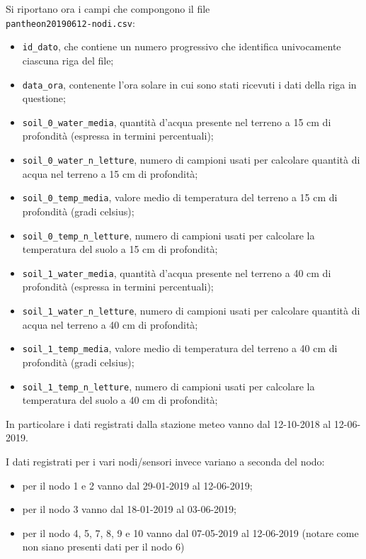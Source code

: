 Si riportano ora i campi che compongono il file \\ \texttt{pantheon20190612-nodi.csv}:

\begin{itemize}
  \item \texttt{id\_dato}, che contiene un numero progressivo che identifica univocamente ciascuna riga del file;
  \item \texttt{data\_ora}, contenente l'ora solare in cui sono stati ricevuti i dati della riga in questione;
  \item \texttt{soil\_0\_water\_media}, quantità d'acqua presente nel terreno a 15 cm di profondità (espressa in termini percentuali);
  \item \texttt{soil\_0\_water\_n\_letture}, numero di campioni usati per calcolare quantità di acqua nel terreno a 15 cm di profondità;
  \item \texttt{soil\_0\_temp\_media}, valore medio di temperatura del terreno a 15 cm di profondità (gradi celsius);
  \item \texttt{soil\_0\_temp\_n\_letture}, numero di campioni usati per calcolare la temperatura del suolo a 15 cm di profondità;
  \item \texttt{soil\_1\_water\_media}, quantità d'acqua presente nel terreno a 40 cm di profondità (espressa in termini percentuali);
  \item \texttt{soil\_1\_water\_n\_letture}, numero di campioni usati per calcolare quantità di acqua nel terreno a 40 cm di profondità;
  \item \texttt{soil\_1\_temp\_media}, valore medio di temperatura del terreno a 40 cm di profondità (gradi celsius);
  \item \texttt{soil\_1\_temp\_n\_letture}, numero di campioni usati per calcolare la temperatura del suolo a 40 cm di profondità;
\end{itemize}

In particolare i dati registrati dalla stazione meteo vanno dal 12-10-2018 al 12-06-2019.\par
I dati registrati per i vari nodi/sensori invece variano a seconda del nodo:

\begin{itemize}
    \item per il nodo 1 e 2 vanno dal 29-01-2019 al 12-06-2019;
    \item per il nodo 3 vanno dal 18-01-2019 al 03-06-2019;
    \item per il nodo 4, 5, 7, 8, 9 e 10 vanno dal 07-05-2019 al 12-06-2019 (notare come non siano presenti dati per il nodo 6)
\end{itemize}{}